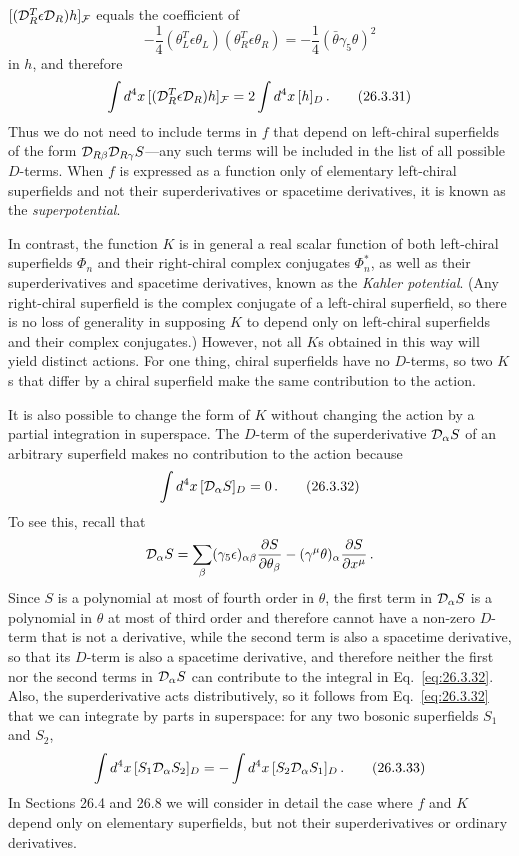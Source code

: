 $[(\mathcal{D}_R^T\epsilon\mathcal{D}_R)h]_{\mathcal{F}}$ equals the coefficient of
\[
  -\frac14(\theta_L^T\epsilon\theta_L)
  (\theta_R^T\epsilon\theta_R)
  =-\frac14(\bar\theta\gamma_5\theta)^2
\]
in $h$, and therefore
\begin{equation}
  \int d^4x\,
  [(\mathcal{D}_R^T\epsilon\mathcal{D}_R)h]_{\mathcal{F}}
  =2\int d^4x\,[h]_D\,.
  \tag{26.3.31}\label{eq:26.3.31}
\end{equation}
Thus we do not need to include terms in $f$ that depend on left-chiral
superfields of the form $\mathcal{D}_{R\beta}\mathcal{D}_{R\gamma}S$---any such terms
will be included in the list of all possible $D$-terms. When $f$ is expressed
as a function only of elementary left-chiral superfields and not their
superderivatives or spacetime derivatives, it is known as the
\emph{superpotential}.

In contrast, the function $K$ is in general a real scalar function of both
left-chiral superfields $\Phi_n$ and their right-chiral complex conjugates
$\Phi_n^*$, as well as their superderivatives and spacetime derivatives,
known as the \emph{Kahler potential}. (Any right-chiral superfield is the
complex conjugate of a left-chiral superfield, so there is no loss of
generality in supposing $K$ to depend only on left-chiral superfields and
their complex conjugates.) However, not all $K$s obtained in this way will
yield distinct actions. For one thing, chiral superfields have no $D$-terms,
so two $K$s that differ by a chiral superfield make the same contribution to
the action.

It is also possible to change the form of $K$ without changing the action by a
partial integration in superspace. The $D$-term of the superderivative
$\mathcal{D}_\alpha S$ of an arbitrary superfield makes no contribution to the
action because
\begin{equation}
  \int d^4x\,[\mathcal{D}_\alpha S]_D=0\,.
  \tag{26.3.32}\label{eq:26.3.32}
\end{equation}
To see this, recall that
\[
  \mathcal{D}_\alpha S
  =\sum_\beta(\gamma_5\epsilon)_{\alpha\beta}
    \frac{\partial S}{\partial\theta_\beta}
  -(\gamma^\mu\theta)_\alpha\frac{\partial S}{\partial x^\mu}\,.
\]
Since $S$ is a polynomial at most of fourth order in $\theta$, the first term
in $\mathcal{D}_\alpha S$ is a polynomial in $\theta$ at most of third order and
therefore cannot have a non-zero $D$-term that is not a derivative, while the
second term is also a spacetime derivative, so that its $D$-term is also a
spacetime derivative, and therefore neither the first nor the second terms in
$\mathcal{D}_\alpha S$ can contribute to the integral in
Eq.~\eqref{eq:26.3.32}. Also, the superderivative acts distributively, so it
follows from Eq.~\eqref{eq:26.3.32} that we can integrate by parts in
superspace: for any two bosonic superfields $S_1$ and $S_2$,
\begin{equation}
  \int d^4x\,[S_1\mathcal{D}_\alpha S_2]_D
  =-\int d^4x\,[S_2\mathcal{D}_\alpha S_1]_D\,.
  \tag{26.3.33}\label{eq:26.3.33}
\end{equation}
In Sections 26.4 and 26.8 we will consider in detail the case where $f$ and
$K$ depend only on elementary superfields, but not their superderivatives or
ordinary derivatives.

